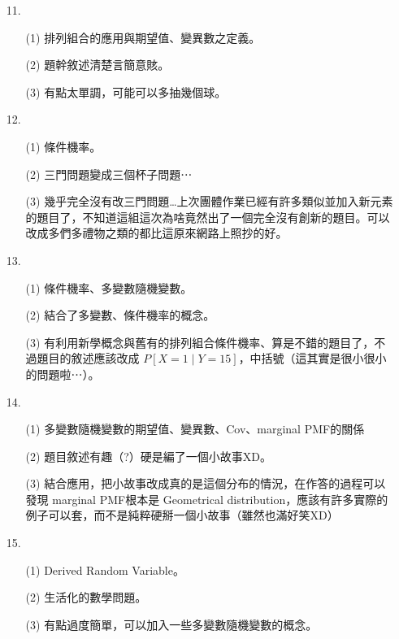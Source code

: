 \documentclass{article}
\begin{document}
\begin{enumerate}
    \item [11.]
    \begin{enumerate}
        \item [(1)] 排列組合的應用與期望值、變異數之定義。
        \item [(2)] 題幹敘述清楚言簡意賅。
        \item [(3)] 有點太單調，可能可以多抽幾個球。
    \end{enumerate}

    \item [12.]
    \begin{enumerate}
        \item [(1)] 條件機率。
        \item [(2)] 三門問題變成三個杯子問題⋯
        \item [(3)] 幾乎完全沒有改三門問題…上次團體作業已經有許多類似並加入新元素的題目了，不知道這組這次為啥竟然出了一個完全沒有創新的題目。可以改成多們多禮物之類的都比這原來網路上照抄的好。
    \end{enumerate}

    \item [13.]
    \begin{enumerate}
        \item [(1)] 條件機率、多變數隨機變數。
        \item [(2)] 結合了多變數、條件機率的概念。
        \item [(3)] 有利用新學概念與舊有的排列組合條件機率、算是不錯的題目了，不過題目的敘述應該改成 $P[X = 1 \mid Y = 15]$，中括號（這其實是很小很小的問題啦⋯）。
    \end{enumerate}

    \item [14.]
    \begin{enumerate}
        \item [(1)] 多變數隨機變數的期望值、變異數、Cov、marginal PMF的關係
        \item [(2)] 題目敘述有趣（?）硬是編了一個小故事XD。
        \item [(3)] 結合應用，把小故事改成真的是這個分布的情況，在作答的過程可以發現 marginal PMF根本是 Geometrical distribution，應該有許多實際的例子可以套，而不是純粹硬掰一個小故事（雖然也滿好笑XD）
    \end{enumerate}

    \item [15.]
    \begin{enumerate}
        \item [(1)] Derived Random Variable。
        \item [(2)] 生活化的數學問題。
        \item [(3)] 有點過度簡單，可以加入一些多變數隨機變數的概念。
    \end{enumerate}


\end{enumerate}
\end{document}
